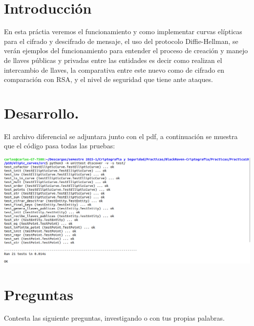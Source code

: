 \documentclass{article}
\begin{document}
\section*{Introducción}

En esta práctia veremos el funcionamiento y como implementar curvas elípticas para el cifrado y descifrado de mensaje, el uso del protocolo Diffie-Hellman, se verán ejemplos del funcionamiento para entender el proceso de creación y manejo de llaves públicas y privadas entre las entidades es decir como realizan el intercambio de llaves, la comparativa entre este nuevo como de cifrado en comparación con RSA, y el nivel de seguridad que tiene ante ataques.

\section*{Desarrollo.}

El archivo diferencial se adjuntara junto con el pdf, a continuación se muestra que el código pasa todas las pruebas:

\begin{center}
    \includegraphics[scale = .45]{IMAGE/Pruebas.png}
\end{center}

\section*{Preguntas}

Contesta las siguiente preguntas, investigando o con tus propias palabras.
\end{document}
